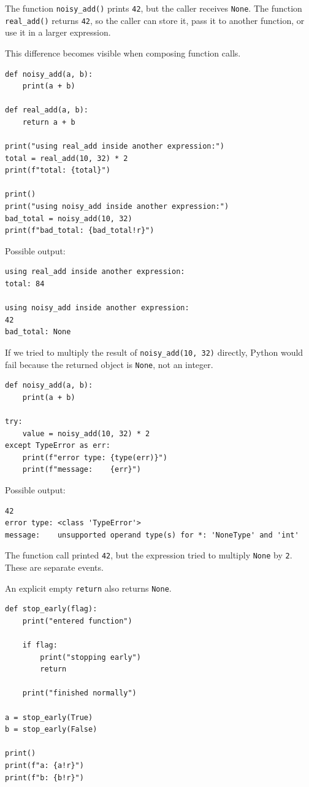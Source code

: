 The function \texttt{noisy\_add()} prints \texttt{42}, but the caller receives \texttt{None}. The function \texttt{real\_add()} returns \texttt{42}, so the caller can store it, pass it to another function, or use it in a larger expression.

This difference becomes visible when composing function calls.

\begin{verbatim}
def noisy_add(a, b):
    print(a + b)

def real_add(a, b):
    return a + b

print("using real_add inside another expression:")
total = real_add(10, 32) * 2
print(f"total: {total}")

print()
print("using noisy_add inside another expression:")
bad_total = noisy_add(10, 32)
print(f"bad_total: {bad_total!r}")
\end{verbatim}

Possible output:

\begin{verbatim}
using real_add inside another expression:
total: 84

using noisy_add inside another expression:
42
bad_total: None
\end{verbatim}

If we tried to multiply the result of \texttt{noisy\_add(10, 32)} directly, Python would fail because the returned object is \texttt{None}, not an integer.

\begin{verbatim}
def noisy_add(a, b):
    print(a + b)

try:
    value = noisy_add(10, 32) * 2
except TypeError as err:
    print(f"error type: {type(err)}")
    print(f"message:    {err}")
\end{verbatim}

Possible output:

\begin{verbatim}
42
error type: <class 'TypeError'>
message:    unsupported operand type(s) for *: 'NoneType' and 'int'
\end{verbatim}

The function call printed \texttt{42}, but the expression tried to multiply \texttt{None} by \texttt{2}. These are separate events.

An explicit empty \texttt{return} also returns \texttt{None}.

\begin{verbatim}
def stop_early(flag):
    print("entered function")

    if flag:
        print("stopping early")
        return

    print("finished normally")

a = stop_early(True)
b = stop_early(False)

print()
print(f"a: {a!r}")
print(f"b: {b!r}")
\end{verbatim}

